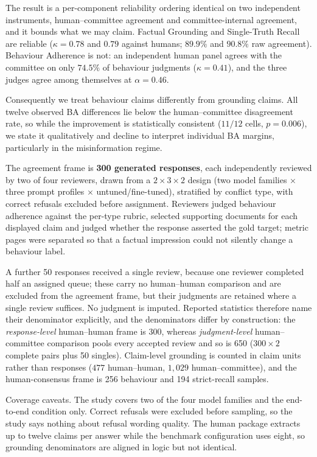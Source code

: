 

The result is a per-component reliability ordering identical on two independent
instruments, human--committee agreement and committee-internal agreement, and it
bounds what we may claim. Factual Grounding and Single-Truth Recall are reliable
($\kappa=0.78$ and $0.79$ against humans; $89.9\%$ and $90.8\%$ raw agreement).
Behaviour Adherence is not: an independent human panel agrees with the committee
on only $74.5\%$ of behaviour judgments ($\kappa=0.41$), and the three judges
agree among themselves at $\alpha=0.46$.

Consequently we treat behaviour claims differently from grounding claims. All
twelve observed BA differences lie below the human--committee disagreement rate,
so while the improvement is statistically consistent ($11/12$ cells, $p=0.006$),
we state it qualitatively and decline to interpret individual BA margins,
particularly in the misinformation regime.

The agreement frame is \textbf{300 generated responses}, each independently
reviewed by two of four reviewers, drawn from a $2\times3\times2$ design (two
model families $\times$ three prompt profiles $\times$ untuned/fine-tuned),
stratified by conflict type, with correct refusals excluded before assignment.
Reviewers judged behaviour
adherence against the per-type rubric, selected supporting documents for each
displayed claim and judged whether the response asserted the gold target;
metric pages were separated so that a factual impression could not silently
change a behaviour label.

A further 50 responses received a single review, because one reviewer completed
half an assigned queue; these carry no human--human comparison and are excluded
from the agreement frame, but their judgments are retained where a single
review suffices. No judgment is imputed. Reported statistics therefore name
their denominator explicitly, and the denominators differ by construction: the
\emph{response-level} human--human frame is 300, whereas \emph{judgment-level}
human--committee comparison pools every accepted review and so is 650
($300\times2$ complete pairs plus 50 singles). Claim-level grounding is counted
in claim units rather than responses ($477$ human--human, $1{,}029$
human--committee), and the human-consensus frame is 256 behaviour and 194
strict-recall samples.

Coverage caveats. The study covers two of the four model families and the
end-to-end condition only. Correct refusals were excluded before sampling, so the
study says nothing about refusal wording quality. The human package extracts up
to twelve claims per answer while the benchmark configuration uses eight, so
grounding denominators are aligned in logic but not identical.

